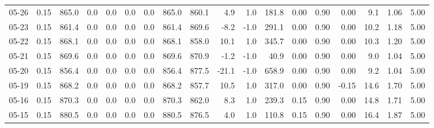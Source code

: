 \begin{threeparttable}
{\begin{tabular}{lrrrrrrrrrrrrrrrrr}
  05-26 &     0.15 & 865.0 &               0.0 &               0.0 &                0.0 &                0.0 & 865.0 & 860.1 &        4.9 &                      1.0 &               181.8 &       0.00 &      0.90 &           0.00 &              9.1 &            1.06 &                   5.00 \\
  05-23 &     0.15 & 861.4 &               0.0 &               0.0 &                0.0 &                0.0 & 861.4 & 869.6 &       -8.2 &                     -1.0 &               291.1 &       0.00 &      0.90 &           0.00 &             10.2 &            1.18 &                   5.00 \\
  05-22 &     0.15 & 868.1 &               0.0 &               0.0 &                0.0 &                0.0 & 868.1 & 858.0 &       10.1 &                      1.0 &               345.7 &       0.00 &      0.90 &           0.00 &             10.3 &            1.20 &                   5.00 \\
  05-21 &     0.15 & 869.6 &               0.0 &               0.0 &                0.0 &                0.0 & 869.6 & 870.9 &       -1.2 &                     -1.0 &                40.9 &       0.00 &      0.90 &           0.00 &              9.0 &            1.04 &                   5.00 \\
  05-20 &     0.15 & 856.4 &               0.0 &               0.0 &                0.0 &                0.0 & 856.4 & 877.5 &      -21.1 &                     -1.0 &               658.9 &       0.00 &      0.90 &           0.00 &              9.2 &            1.04 &                   5.00 \\
  05-19 &     0.15 & 868.2 &               0.0 &               0.0 &                0.0 &                0.0 & 868.2 & 857.7 &       10.5 &                      1.0 &               317.0 &       0.00 &      0.90 &          -0.15 &             14.6 &            1.70 &                   5.00 \\
  05-16 &     0.15 & 870.3 &               0.0 &               0.0 &                0.0 &                0.0 & 870.3 & 862.0 &        8.3 &                      1.0 &               239.3 &       0.15 &      0.90 &           0.00 &             14.8 &            1.71 &                   5.00 \\
  05-15 &     0.15 & 880.5 &               0.0 &               0.0 &                0.0 &                0.0 & 880.5 & 876.5 &        4.0 &                      1.0 &               110.8 &       0.15 &      0.90 &           0.00 &             16.4 &            1.87 &                   5.00 \\

\end{tabular}}
\end{threeparttable}
